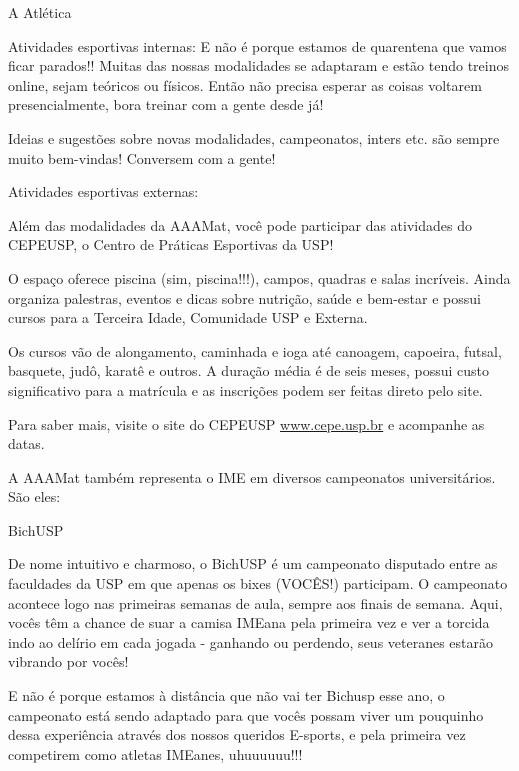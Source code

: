 \begin{secao}{A Atlética}
\begin{subsecao}{Atividades esportivas internas:}
E não é porque estamos de quarentena que vamos ficar parados!! Muitas das nossas
modalidades se adaptaram e estão tendo treinos online, sejam teóricos ou físicos.
Então não precisa esperar as coisas voltarem presencialmente, bora treinar com a
gente desde já!

Ideias e sugestões sobre novas modalidades, campeonatos, inters etc. são
sempre muito bem-vindas! Conversem com a gente!

\end{subsecao}

\begin{subsecao}{Atividades esportivas externas:}

Além das modalidades da AAAMat, você pode participar das atividades do CEPEUSP, o 
Centro de Práticas Esportivas da USP! 

O espaço oferece piscina (sim, piscina!!!), campos, quadras e salas incríveis.
Ainda organiza palestras, eventos e dicas sobre nutrição, saúde e bem-estar e possui 
cursos para a Terceira Idade, Comunidade USP e Externa. 

Os cursos vão de alongamento, caminhada e ioga até canoagem, capoeira, futsal, 
basquete, judô, karatê e outros. A duração média é de seis meses, possui custo 
significativo para a matrícula e as inscrições podem ser feitas direto pelo site. 

Para saber mais, visite o site do CEPEUSP \url{www.cepe.usp.br} e acompanhe as
datas. 

\end{subsecao}

A AAAMat também representa o IME em diversos campeonatos universitários. São
eles:

\begin{subsecao}{BichUSP}

De nome intuitivo e charmoso, o BichUSP é um campeonato disputado entre as
faculdades da USP em que apenas os bixes (VOCÊS!) participam. O campeonato
acontece logo nas primeiras semanas de aula, sempre aos finais de semana. Aqui,
vocês têm a chance de suar a camisa IMEana pela primeira vez e ver a torcida
indo ao delírio em cada jogada - ganhando ou perdendo, seus veteranes estarão
vibrando por vocês!

E não é porque estamos à distância que não vai ter Bichusp esse ano, o campeonato
está sendo adaptado para que vocês possam viver um pouquinho dessa experiência
através dos nossos queridos E-sports, e pela primeira vez competirem como atletas
IMEanes, uhuuuuuu!!!


\end{subsecao}
\end{secao}
